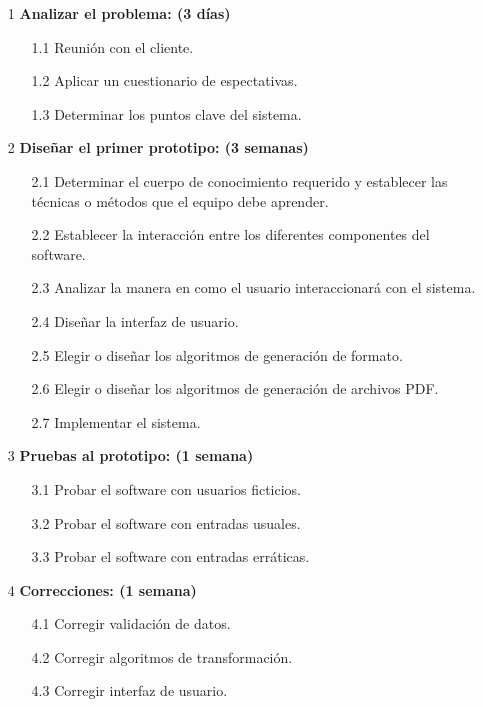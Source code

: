 \documentclass[letterpaper]{article}
\begin{document}
\begin{enumerate}
\item[1] \textbf{Analizar el problema: (3 días)}
  \begin{enumerate}
  \item[1.1] Reunión con el cliente.
  \item[1.2] Aplicar un cuestionario de espectativas.
  \item[1.3] Determinar los puntos clave del sistema.
  \end{enumerate}
\item[2] \textbf{Diseñar el primer prototipo: (3 semanas)}
  \begin{enumerate}
  \item[2.1] Determinar el cuerpo de conocimiento requerido y establecer las técnicas o métodos que el equipo debe aprender.
  \item[2.2] Establecer la interacción entre los diferentes componentes del software.
  \item[2.3] Analizar la manera en como el usuario interaccionará con el sistema.
  \item[2.4] Diseñar la interfaz de usuario.
  \item[2.5] Elegir o diseñar los algoritmos de generación de formato.
  \item[2.6] Elegir o diseñar los algoritmos de generación de archivos PDF.
  \item[2.7] Implementar el sistema.
  \end{enumerate}
  
  \item[3] \textbf{Pruebas al prototipo: (1 semana)}
    \begin{enumerate}
    \item[3.1] Probar el software con usuarios ficticios.
    \item[3.2] Probar el software con entradas usuales.
    \item[3.3] Probar el software con entradas erráticas.
    \end{enumerate}
    
  \item[4] \textbf{Correcciones: (1 semana)}
    \begin{enumerate}
    \item[4.1] Corregir validación de datos.
    \item[4.2] Corregir algoritmos de transformación.
    \item[4.3] Corregir interfaz de usuario.
    \end{enumerate}
    

\end{enumerate}
\end{document}
